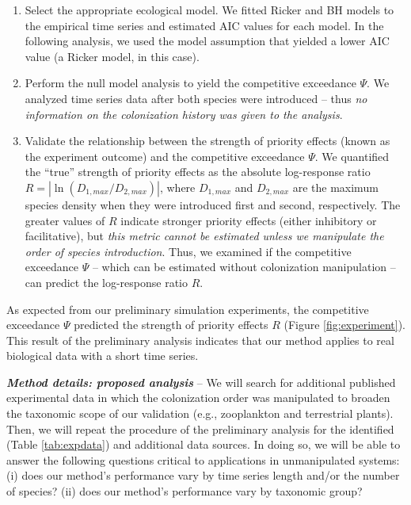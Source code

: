 \documentclass[12pt, class=article, crop=false]{standalone}
\begin{document}
\begin{enumerate}
    \item Select the appropriate ecological model.
    We fitted Ricker and BH models to the empirical time series and estimated AIC values for each model.
    In the following analysis, we used the model assumption that yielded a lower AIC value (a Ricker model, in this case).
    \item Perform the null model analysis to yield the competitive exceedance $\Psi$.
    We analyzed time series data after both species were introduced -- thus \textit{no information on the colonization history was given to the analysis}.
    \item Validate the relationship between the strength of priority effects (known as the experiment outcome) and the competitive exceedance $\Psi$.
    We quantified the ``true'' strength of priority effects as the absolute log-response ratio $R = |\ln (D_{1, max} / D_{2, max})|$, where $D_{1, max}$ and $D_{2, max}$ are the maximum species density when they were introduced first and second, respectively.
    The greater values of $R$ indicate stronger priority effects (either inhibitory or facilitative), but \textit{this metric cannot be estimated unless we manipulate the order of species introduction}.
    Thus, we examined if the competitive exceedance $\Psi$ -- which can be estimated without colonization manipulation -- can predict the log-response ratio $R$.
\end{enumerate}

As expected from our preliminary simulation experiments, the competitive exceedance $\Psi$ predicted the strength of priority effects $R$ (Figure \ref{fig:experiment}).
This result of the preliminary analysis indicates that our method applies to real biological data with a short time series.

\textit{\textbf{Method details: proposed analysis}} --
We will search for additional published experimental data in which the colonization order was manipulated to broaden the taxonomic scope of our validation (e.g., zooplankton and terrestrial plants).
Then, we will repeat the procedure of the preliminary analysis for the identified (Table \ref{tab:expdata}) and additional data sources. 
In doing so, we will be able to answer the following questions critical to applications in unmanipulated systems: (i) does our method's performance vary by time series length and/or the number of species? (ii) does our method's performance vary by taxonomic group?
\end{document}
